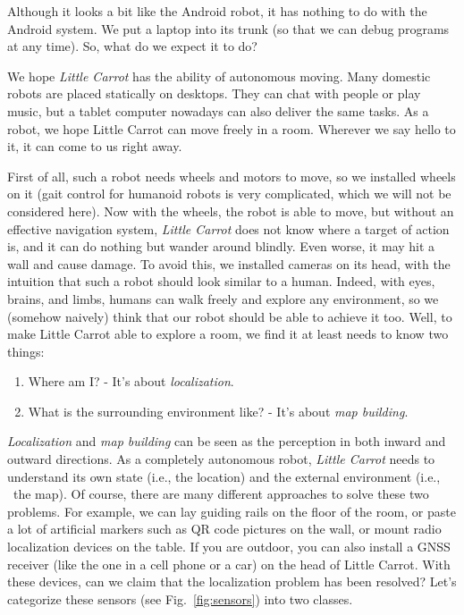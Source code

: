 Although it looks a bit like the Android robot, it has nothing to do with the Android system. We put a laptop into its trunk (so that we can debug programs at any time). So, what do we expect it to do? 

We hope \textit{Little Carrot} has the ability of autonomous moving. Many domestic robots are placed statically on desktops. They can chat with people or play music, but a tablet computer nowadays can also deliver the same tasks. As a robot, we hope Little Carrot can move freely in a room. Wherever we say hello to it, it can come to us right away.

First of all, such a robot needs wheels and motors to move, so we installed wheels on it (gait control for humanoid robots is very complicated, which we will not be considered here). Now with the wheels, the robot is able to move, but without an effective navigation system, \textit{Little Carrot} does not know where a target of action is, and it can do nothing but wander around blindly. Even worse, it may hit a wall and cause damage. To avoid this, we installed cameras on its head, with the intuition that such a robot should look similar to a human. Indeed, with eyes, brains, and limbs, humans can walk freely and explore any environment, so we (somehow naively) think that our robot should be able to achieve it too. Well, to make Little Carrot able to explore a room, we find it at least needs to know two things:

\begin{enumerate}
	\item Where am I? - It's about \emph{localization}.
	\item What is the surrounding environment like? - It's about \emph{map building}.
\end{enumerate}

\textit{Localization} and \textit{map building} can be seen as the perception in both inward and outward directions. As a completely autonomous robot, \textit{Little Carrot} needs to understand its own state (i.e., the location) and the external environment (i.e., \ the map). Of course, there are many different approaches to solve these two problems. For example, we can lay guiding rails on the floor of the room, or paste a lot of artificial markers such as QR code pictures on the wall, or mount radio localization devices on the table. If you are outdoor, you can also install a GNSS receiver (like the one in a cell phone or a car) on the head of Little Carrot. With these devices, can we claim that the localization problem has been resolved? Let's categorize these sensors (see Fig.~\ref{fig:sensors}) into two classes.

